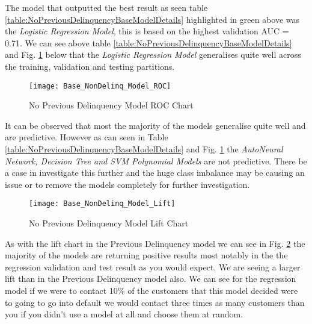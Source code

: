 The model that outputted the best result as seen table \ref{table:NoPreviousDelinquencyBaseModelDetails} highlighted in green above  was the \textit{Logistic Regression Model}, this is based on the highest validation AUC = 0.71. We can see above table \ref{table:NoPreviousDelinquencyBaseModelDetails} and Fig. \ref{fig:NonDelinq_Model_ROC} below that the \textit{Logistic Regression Model} generalises quite well across the training, validation and testing partitions.

\begin{figure}[H]
	\texttt{[image: Base\_NonDelinq\_Model\_ROC]}
	\caption{No Previous Delinquency Model ROC Chart}
	\label{fig:NonDelinq_Model_ROC}
\end{figure}

It can be observed that most the majority of the models generalise quite well and are predictive. However as can seen in Table \ref{table:NoPreviousDelinquencyBaseModelDetails} and Fig. \ref{fig:NonDelinq_Model_ROC} the \textit{AutoNeural Network, Decision Tree and SVM Polynomial Models} are not predictive. There be a case in investigate this further and the huge class imbalance may be causing an issue or to remove the models completely for further investigation.

\begin{figure}[H]
	\texttt{[image: Base\_NonDelinq\_Model\_Lift]}
	\caption{No Previous Delinquency Model Lift Chart}
	\label{fig:NonDelinq_Model_Lift}
\end{figure}

As with the lift chart in the Previous Delinquency model we can see in Fig. \ref{fig:NonDelinq_Model_Lift} the majority of the models are returning positive results most notably in the the regression validation and test result as you would expect. We are seeing a larger lift than in the Previous Delinquency model also. We can see for the regression model if we were to contact 10\% of the customers that this model decided were to going to go into default we would contact three times as many customers than you if you didn't use a model at all and choose them at random. 

